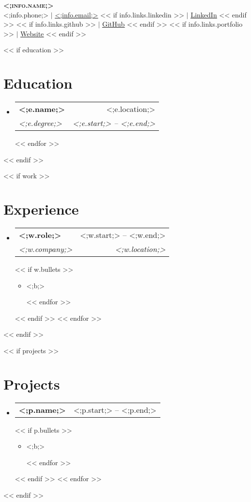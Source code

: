 \documentclass[letterpaper,11pt]{article}
\makeatletter
\newcommand{\resumeItem}[1]{
  \item\small{
    {#1 \vspace{-2pt}}
  }
}
\newcommand{\resumeSubheading}[4]{
  \vspace{-2pt}\item
    \begin{tabular*}{0.97\textwidth}[t]{l@{\extracolsep{\fill}}r}
      \textbf{#1} & #2 \\
      \textit{\small#3} & \textit{\small #4} \\
    \end{tabular*}\vspace{-7pt}
}
\newcommand{\resumeProjectHeading}[2]{
    \item
    \begin{tabular*}{0.97\textwidth}{l@{\extracolsep{\fill}}r}
      \small#1 & #2 \\
    \end{tabular*}\vspace{-7pt}
}
\newcommand{\resumeSubHeadingListStart}{\begin{itemize}[leftmargin=0.15in, label={}]}
\newcommand{\resumeSubHeadingListEnd}{\end{itemize}}
\newcommand{\resumeItemListStart}{\begin{itemize}}
\newcommand{\resumeItemListEnd}{\end{itemize}\vspace{-5pt}}
\makeatother
\begin{document}

\begin{center}
    \textbf{\Huge \scshape <;info.name;>} \\ \vspace{1pt}
    \small <;info.phone;> $|$
    \href{mailto:<;info.email;>)}{\underline{<;info.email;>}}
    << if info.links.linkedin >>
    $|$ \href{<;info.links.linkedin;>}{\underline{LinkedIn}} 
    << endif >>
    << if info.links.github >>
    $|$ \href{<;info.links.github;>}{\underline{GitHub}}
    << endif >>
    << if info.links.portfolio >>
    $|$ \href{<;info.links.portfolio;>}{\underline{Website}} 
    << endif >>
\end{center}



<< if education >>
\section{Education}
  \resumeSubHeadingListStart
  << for e in education >>
    \resumeSubheading
      {<;e.name;>}{<;e.location;>}
      {<;e.degree;>}{
          <;e.start;>
          --
          <;e.end;>
      }
  << endfor >>
  \resumeSubHeadingListEnd
<< endif >>



<< if work >>
\section{Experience}
  \resumeSubHeadingListStart
    << for w in work >>
    \resumeSubheading
      {<;w.role;>}{<;w.start;> -- <;w.end;>}
      {<;w.company;>}{<;w.location;>}
      << if w.bullets >>
      \resumeItemListStart
        << for b in w.bullets >>
        \resumeItem{<;b;>}
        << endfor >>
      \resumeItemListEnd
      << endif >>
    << endfor >>
  \resumeSubHeadingListEnd
<< endif >>



<< if projects >>
\section{Projects}
    \resumeSubHeadingListStart
    << for p in projects >>
      \resumeProjectHeading
          {\textbf{<;p.name;>}}{<;p.start;> -- <;p.end;>}
          << if p.bullets >>
          \resumeItemListStart
          << for b in p.bullets >>
            \resumeItem{<;b;>}
          << endfor >>
          \resumeItemListEnd
          << endif >>
    << endfor >>
    \resumeSubHeadingListEnd
<< endif >>
\end{document}
